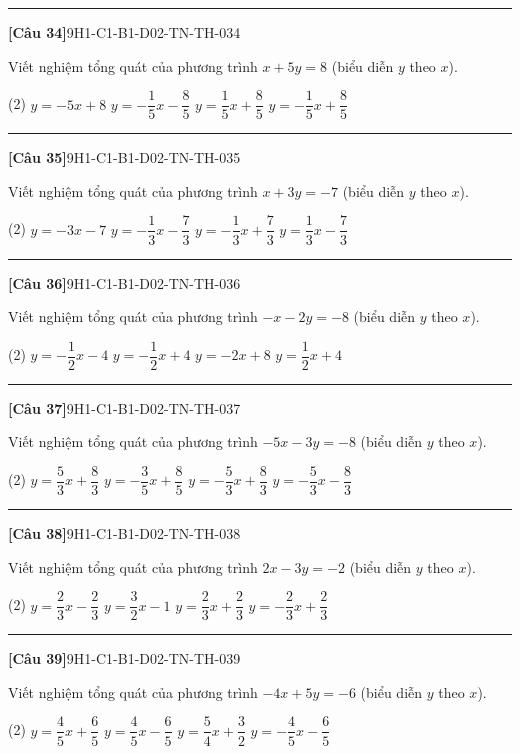 \documentclass[12pt,a4paper]{article}
\newif\ifloigiai
\newenvironment{cauhoi}[2]{%
  \par\medskip\noindent\rule{\textwidth}{0.4pt}\par\nopagebreak
  \noindent\textbf{[#1]}\hfill{\scriptsize\ttfamily #2}\par\nopagebreak\smallskip}{\par}
\newcommand{\dapan}[1]{\ifloigiai\par\smallskip\noindent\textit{Đáp án:} \textbf{#1}\par\fi}
\begin{document}
\begin{cauhoi}{Câu 34}{9H1-C1-B1-D02-TN-TH-034}
Viết nghiệm tổng quát của phương trình $x+5y=8$ (biểu diễn $y$ theo $x$).
\begin{tasks}(2)
\task $y=-5x+8$
\task $y=-\dfrac{1}{5}x-\dfrac{8}{5}$
\task $y=\dfrac{1}{5}x+\dfrac{8}{5}$
\task $y=-\dfrac{1}{5}x+\dfrac{8}{5}$
\end{tasks}
\dapan{D}
\end{cauhoi}
\begin{cauhoi}{Câu 35}{9H1-C1-B1-D02-TN-TH-035}
Viết nghiệm tổng quát của phương trình $x+3y=-7$ (biểu diễn $y$ theo $x$).
\begin{tasks}(2)
\task $y=-3x-7$
\task $y=-\dfrac{1}{3}x-\dfrac{7}{3}$
\task $y=-\dfrac{1}{3}x+\dfrac{7}{3}$
\task $y=\dfrac{1}{3}x-\dfrac{7}{3}$
\end{tasks}
\dapan{B}
\end{cauhoi}
\begin{cauhoi}{Câu 36}{9H1-C1-B1-D02-TN-TH-036}
Viết nghiệm tổng quát của phương trình $-x-2y=-8$ (biểu diễn $y$ theo $x$).
\begin{tasks}(2)
\task $y=-\dfrac{1}{2}x-4$
\task $y=-\dfrac{1}{2}x+4$
\task $y=-2x+8$
\task $y=\dfrac{1}{2}x+4$
\end{tasks}
\dapan{B}
\end{cauhoi}
\begin{cauhoi}{Câu 37}{9H1-C1-B1-D02-TN-TH-037}
Viết nghiệm tổng quát của phương trình $-5x-3y=-8$ (biểu diễn $y$ theo $x$).
\begin{tasks}(2)
\task $y=\dfrac{5}{3}x+\dfrac{8}{3}$
\task $y=-\dfrac{3}{5}x+\dfrac{8}{5}$
\task $y=-\dfrac{5}{3}x+\dfrac{8}{3}$
\task $y=-\dfrac{5}{3}x-\dfrac{8}{3}$
\end{tasks}
\dapan{C}
\end{cauhoi}
\begin{cauhoi}{Câu 38}{9H1-C1-B1-D02-TN-TH-038}
Viết nghiệm tổng quát của phương trình $2x-3y=-2$ (biểu diễn $y$ theo $x$).
\begin{tasks}(2)
\task $y=\dfrac{2}{3}x-\dfrac{2}{3}$
\task $y=\dfrac{3}{2}x-1$
\task $y=\dfrac{2}{3}x+\dfrac{2}{3}$
\task $y=-\dfrac{2}{3}x+\dfrac{2}{3}$
\end{tasks}
\dapan{C}
\end{cauhoi}
\begin{cauhoi}{Câu 39}{9H1-C1-B1-D02-TN-TH-039}
Viết nghiệm tổng quát của phương trình $-4x+5y=-6$ (biểu diễn $y$ theo $x$).
\begin{tasks}(2)
\task $y=\dfrac{4}{5}x+\dfrac{6}{5}$
\task $y=\dfrac{4}{5}x-\dfrac{6}{5}$
\task $y=\dfrac{5}{4}x+\dfrac{3}{2}$
\task $y=-\dfrac{4}{5}x-\dfrac{6}{5}$
\end{tasks}
\dapan{B}
\end{cauhoi}
\end{document}
